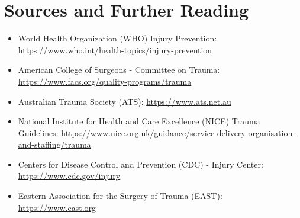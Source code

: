 \section*{Sources and Further Reading}
\begin{itemize}
    \item World Health Organization (WHO) Injury Prevention: \url{https://www.who.int/health-topics/injury-prevention}
    \item American College of Surgeons - Committee on Trauma: \url{https://www.facs.org/quality-programs/trauma}
    \item Australian Trauma Society (ATS): \url{https://www.ats.net.au}
    \item National Institute for Health and Care Excellence (NICE) Trauma Guidelines: \url{https://www.nice.org.uk/guidance/service-delivery-organisation-and-staffing/trauma}
    \item Centers for Disease Control and Prevention (CDC) - Injury Center: \url{https://www.cdc.gov/injury}
    \item Eastern Association for the Surgery of Trauma (EAST): \url{https://www.east.org}
\end{itemize}